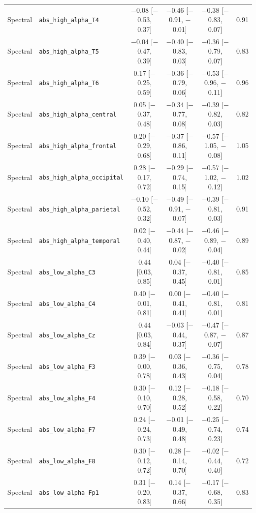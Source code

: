 {\begin{longtable}{llcccc}
Spectral & \texttt{abs\_high\_alpha\_T4} & $-$0.08 [$-$0.53, 0.37] & $-$0.46 [$-$0.91, $-$0.01] & $-$0.38 [$-$0.83, 0.07] & 0.91 \\
Spectral & \texttt{abs\_high\_alpha\_T5} & $-$0.04 [$-$0.47, 0.39] & $-$0.40 [$-$0.83, 0.03] & $-$0.36 [$-$0.79, 0.07] & 0.83 \\
Spectral & \texttt{abs\_high\_alpha\_T6} & 0.17 [$-$0.25, 0.59] & $-$0.36 [$-$0.79, 0.06] & $-$0.53 [$-$0.96, $-$0.11] & 0.96 \\
Spectral & \texttt{abs\_high\_alpha\_central} & 0.05 [$-$0.37, 0.48] & $-$0.34 [$-$0.77, 0.08] & $-$0.39 [$-$0.82, 0.03] & 0.82 \\
Spectral & \texttt{abs\_high\_alpha\_frontal} & 0.20 [$-$0.29, 0.68] & $-$0.37 [$-$0.86, 0.11] & $-$0.57 [$-$1.05, $-$0.08] & 1.05 \\
Spectral & \texttt{abs\_high\_alpha\_occipital} & 0.28 [$-$0.17, 0.72] & $-$0.29 [$-$0.74, 0.15] & $-$0.57 [$-$1.02, $-$0.12] & 1.02 \\
Spectral & \texttt{abs\_high\_alpha\_parietal} & $-$0.10 [$-$0.52, 0.32] & $-$0.49 [$-$0.91, $-$0.07] & $-$0.39 [$-$0.81, 0.03] & 0.91 \\
Spectral & \texttt{abs\_high\_alpha\_temporal} & 0.02 [$-$0.40, 0.44] & $-$0.44 [$-$0.87, $-$0.02] & $-$0.46 [$-$0.89, $-$0.04] & 0.89 \\
Spectral & \texttt{abs\_low\_alpha\_C3} & 0.44 [0.03, 0.85] & 0.04 [$-$0.37, 0.45] & $-$0.40 [$-$0.81, 0.01] & 0.85 \\
Spectral & \texttt{abs\_low\_alpha\_C4} & 0.40 [$-$0.01, 0.81] & 0.00 [$-$0.41, 0.41] & $-$0.40 [$-$0.81, 0.01] & 0.81 \\
Spectral & \texttt{abs\_low\_alpha\_Cz} & 0.44 [0.03, 0.84] & $-$0.03 [$-$0.44, 0.37] & $-$0.47 [$-$0.87, $-$0.07] & 0.87 \\
Spectral & \texttt{abs\_low\_alpha\_F3} & 0.39 [$-$0.00, 0.78] & 0.03 [$-$0.36, 0.43] & $-$0.36 [$-$0.75, 0.04] & 0.78 \\
Spectral & \texttt{abs\_low\_alpha\_F4} & 0.30 [$-$0.10, 0.70] & 0.12 [$-$0.28, 0.52] & $-$0.18 [$-$0.58, 0.22] & 0.70 \\
Spectral & \texttt{abs\_low\_alpha\_F7} & 0.24 [$-$0.24, 0.73] & $-$0.01 [$-$0.49, 0.48] & $-$0.25 [$-$0.74, 0.23] & 0.74 \\
Spectral & \texttt{abs\_low\_alpha\_F8} & 0.30 [$-$0.12, 0.72] & 0.28 [$-$0.14, 0.70] & $-$0.02 [$-$0.44, 0.40] & 0.72 \\
Spectral & \texttt{abs\_low\_alpha\_Fp1} & 0.31 [$-$0.20, 0.83] & 0.14 [$-$0.37, 0.66] & $-$0.17 [$-$0.68, 0.35] & 0.83 \\

\end{longtable}}
